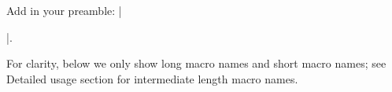 %
%
%
%
%
%

Add in your preamble: |\usepackage{graph-theory-symbol}|.

For clarity, below we only show long macro names and short macro names;
see Detailed usage section for intermediate length macro names.

